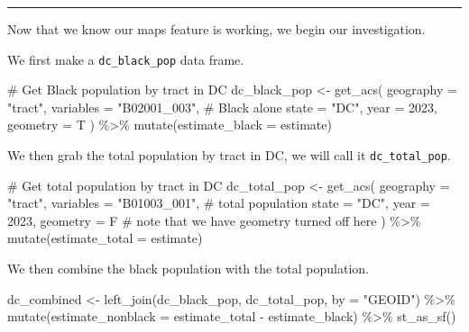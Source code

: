\documentclass[
  letterpaper,
  DIV=11,
  numbers=noendperiod]{scrartcl}
\newenvironment{Shaded}{\begin{snugshade}}{\end{snugshade}}
\newcommand{\AttributeTok}[1]{\textcolor[rgb]{0.40,0.45,0.13}{#1}}
\newcommand{\CommentTok}[1]{\textcolor[rgb]{0.37,0.37,0.37}{#1}}
\newcommand{\DecValTok}[1]{\textcolor[rgb]{0.68,0.00,0.00}{#1}}
\newcommand{\FunctionTok}[1]{\textcolor[rgb]{0.28,0.35,0.67}{#1}}
\newcommand{\NormalTok}[1]{\textcolor[rgb]{0.00,0.23,0.31}{#1}}
\newcommand{\OtherTok}[1]{\textcolor[rgb]{0.00,0.23,0.31}{#1}}
\newcommand{\SpecialCharTok}[1]{\textcolor[rgb]{0.37,0.37,0.37}{#1}}
\newcommand{\StringTok}[1]{\textcolor[rgb]{0.13,0.47,0.30}{#1}}
\begin{document}
\begin{center}\rule{0.5\linewidth}{0.5pt}\end{center}

Now that we know our maps feature is working, we begin our
investigation.

We first make a \texttt{dc\_black\_pop} data frame.

\begin{Shaded}
\begin{Highlighting}[]
\CommentTok{\# Get Black population by tract in DC}
\NormalTok{dc\_black\_pop }\OtherTok{\textless{}{-}} \FunctionTok{get\_acs}\NormalTok{(}
  \AttributeTok{geography =} \StringTok{"tract"}\NormalTok{,}
  \AttributeTok{variables =} \StringTok{"B02001\_003"}\NormalTok{,  }\CommentTok{\# Black alone}
  \AttributeTok{state =} \StringTok{"DC"}\NormalTok{,}
  \AttributeTok{year =} \DecValTok{2023}\NormalTok{,}
  \AttributeTok{geometry =}\NormalTok{ T}
\NormalTok{) }\SpecialCharTok{\%\textgreater{}\%}
  \FunctionTok{mutate}\NormalTok{(}\AttributeTok{estimate\_black =}\NormalTok{ estimate)}
\end{Highlighting}
\end{Shaded}

We then grab the total population by tract in DC, we will call it
\texttt{dc\_total\_pop}.

\begin{Shaded}
\begin{Highlighting}[]
\CommentTok{\# Get total population by tract in DC}
\NormalTok{dc\_total\_pop }\OtherTok{\textless{}{-}} \FunctionTok{get\_acs}\NormalTok{(}
  \AttributeTok{geography =} \StringTok{"tract"}\NormalTok{,}
  \AttributeTok{variables =} \StringTok{"B01003\_001"}\NormalTok{,  }\CommentTok{\# total population}
  \AttributeTok{state =} \StringTok{"DC"}\NormalTok{,}
  \AttributeTok{year =} \DecValTok{2023}\NormalTok{,}
  \AttributeTok{geometry =}\NormalTok{ F }\CommentTok{\# note that we have geometry turned off here}
\NormalTok{) }\SpecialCharTok{\%\textgreater{}\%}
  \FunctionTok{mutate}\NormalTok{(}\AttributeTok{estimate\_total =}\NormalTok{ estimate)}
\end{Highlighting}
\end{Shaded}

We then combine the black population with the total population.

\begin{Shaded}
\begin{Highlighting}[]
\NormalTok{dc\_combined }\OtherTok{\textless{}{-}} \FunctionTok{left\_join}\NormalTok{(dc\_black\_pop, dc\_total\_pop, }\AttributeTok{by =} \StringTok{"GEOID"}\NormalTok{) }\SpecialCharTok{\%\textgreater{}\%}
  \FunctionTok{mutate}\NormalTok{(}\AttributeTok{estimate\_nonblack =}\NormalTok{ estimate\_total }\SpecialCharTok{{-}}\NormalTok{ estimate\_black) }\SpecialCharTok{\%\textgreater{}\%}
  \FunctionTok{st\_as\_sf}\NormalTok{()}
\end{Highlighting}
\end{Shaded}
\end{document}

